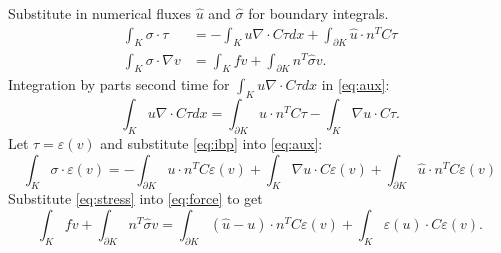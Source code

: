 \documentclass{article}
\begin{document}
	Substitute in numerical fluxes $\hat{u}$ and $\hat{\sigma}$ for boundary integrals.
	\begin{align}
	\int_K \sigma \cdot \tau&=-\int_Ku\nabla\cdot C\tau dx +\int_{\partial K}\hat{u} \cdot  n^T C\tau \label{eq:aux}\\
	\int_K \sigma \cdot \nabla v&=\int_K fv +\int_{\partial K}n^T\hat{\sigma} v .
		\label{eq:force}
	\end{align}
	Integration by parts second time for $\int_Ku\nabla\cdot C\tau dx$ in \autoref{eq:aux}:
	\begin{equation}
	\int_Ku\nabla\cdot C\tau dx=\int_{\partial K}u \cdot n^TC\tau-\int_K\nabla u\cdot C\tau.
	\label{eq:ibp}
	\end{equation}
	Let $\tau=\varepsilon(v)$ and substitute \autoref{eq:ibp} into \autoref{eq:aux}:
	\begin{equation}
	\int_K \sigma \cdot \varepsilon(v) = -\int_{\partial K}u \cdot n^TC\varepsilon(v)+\int_K\nabla u\cdot C \varepsilon(v) +\int_{\partial K}\hat{u} \cdot n^TC\varepsilon(v)
	\label{eq:stress}
	\end{equation}
	Substitute \autoref{eq:stress} into \autoref{eq:force} to get
	\begin{equation}
	\int_K fv + \int_{\partial K}n^T\hat{\sigma}v
	= \int_{\partial K}(\hat{u}-u)\cdot n^TC \varepsilon(v)+\int_K\varepsilon(u) \cdot C\varepsilon(v).
	\end{equation}
		
\end{document}
